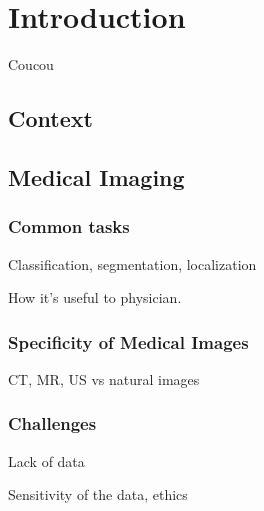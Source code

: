 \chapter{Introduction}
\label{chap:intro}

\begin{chapabstract}
 Coucou
\end{chapabstract}

\vspace{1cm}

{   
    \minitoc
}

\newpage

\section{Context}

\section{Medical Imaging}

\subsection{Common tasks}

Classification, segmentation, localization

How it's useful to physician.

\subsection{Specificity of Medical Images}

CT, MR, US
vs
natural images

\subsection{Challenges}

Lack of data

Sensitivity of the data, ethics

